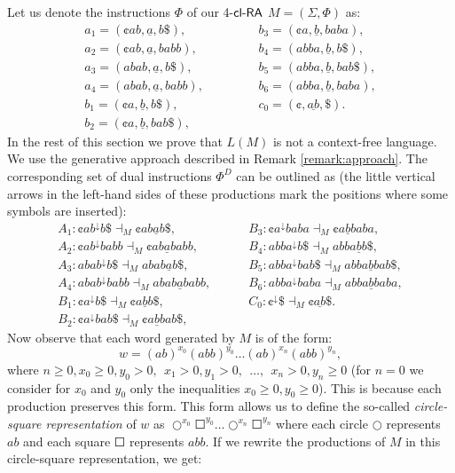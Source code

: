 Let us denote the instructions $\Phi$ of our 4-$\textup{\sf cl-RA\/}$ $M = (\Sigma, \Phi)$ as:
$$
\begin{array}{ll}
a_1 = (\cent ab, \underline{a}, b\$),\hspace{5em}    & b_3 = (\cent a, \underline{b}, baba),\\
a_2 = (\cent ab, \underline{a}, babb),  & b_4 = (abba, \underline{b}, b\$),\\
a_3 = (abab, \underline{a}, b\$),        & b_5 = (abba, \underline{b}, bab\$),\\
a_4 = (abab, \underline{a}, babb),       & b_6 = (abba, \underline{b}, baba),\\
b_1 = (\cent a, \underline{b}, b\$),     & c_0 = (\cent, \underline{ab}, \$).\\
b_2 = (\cent a, \underline{b}, bab\$),
\end{array}
$$
In the rest of this section we prove that $L(M)$ is not a context-free language. We use the generative approach described in Remark \ref{remark:approach}. The corresponding set of dual instructions $\Phi^D$ can be outlined as (the little vertical arrows in the left-hand sides of these productions mark the positions where some symbols are inserted):
$$
\begin{array}{ll}
A_1: \cent ab ^\downarrow b\$ \dashv_M \cent ab \underline{a} b\$,\hspace{5em} & B_3: \cent a ^\downarrow baba \dashv_M \cent a \underline{b} baba,\\
A_2: \cent ab ^\downarrow babb \dashv_M \cent ab \underline{a} babb,           & B_4: abba ^\downarrow b\$ \dashv_M abba \underline{b} b\$,\\
A_3: abab ^\downarrow b\$ \dashv_M abab \underline{a} b\$,                     & B_5: abba ^\downarrow bab\$ \dashv_M abba \underline{b} bab\$,\\
A_4: abab ^\downarrow babb \dashv_M abab \underline{a} babb ,                  & B_6: abba ^\downarrow baba \dashv_M abba \underline{b} baba,\\
B_1: \cent a ^\downarrow b\$ \dashv_M \cent a \underline{b} b\$,               & C_0: \cent ^\downarrow \$ \dashv_M \cent \underline{ab} \$.\\
B_2: \cent a ^\downarrow bab\$ \dashv_M \cent a \underline{b} bab\$,
\end{array}
$$
Now observe that each word generated by $M$ is of the form:
$$w = (ab)^{x_0}(abb)^{y_0} \ldots (ab)^{x_n}(abb)^{y_n},$$
where $n \ge 0, x_0 \ge 0, y_0 > 0, \ \ x_1 > 0, y_1 > 0, \ \ \ldots, \ \ x_n > 0, y_n \ge 0$ (for $n = 0$ we consider for $x_0$ and $y_0$ only the inequalities $x_0 \ge 0, y_0 \ge 0$). This is because each production preserves this form. This form allows us to define the so-called \emph{circle-square representation} of $w$ as $\Circle^{x_0} \Square^{y_0} \ldots \Circle^{x_n} \Square^{y_n}$ where each circle $\Circle$ represents $ab$ and each square $\Square$ represents $abb$. If we rewrite the productions of $M$ in this circle-square representation, we get:
